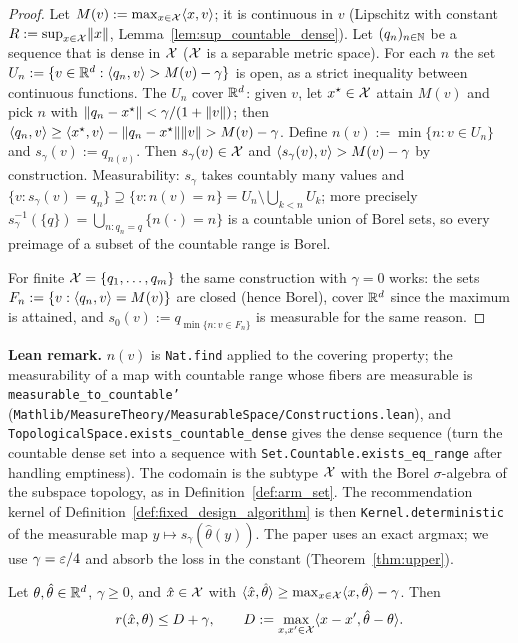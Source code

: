 \begin{proof}
\leanok
{}
Let $M(v) := \max_{x\in\mathcal{X}}\langle x, v \rangle$; it is continuous in $v$ (Lipschitz with constant
$R := \sup_{x\in\mathcal{X}}\lVert x \rVert$, Lemma~\ref{lem:sup_countable_dense}). Let $(q_n)_{n\in\mathbb{N}}$ be a
sequence that is dense in $\mathcal{X}$ ($\mathcal{X}$ is a separable metric space). For each $n$ the set
$U_n := \{v \in \mathbb{R}^d : \langle q_n, v \rangle > M(v) - \gamma\}$ is open, as a strict inequality between
continuous functions. The $U_n$ cover $\mathbb{R}^d$: given $v$, let $x^\star \in \mathcal{X}$ attain $M(v)$ and
pick $n$ with $\lVert q_n - x^\star \rVert < \gamma/(1 + \lVert v \rVert)$; then
$\langle q_n, v \rangle \ge \langle x^\star, v \rangle - \lVert q_n - x^\star \rVert\lVert v \rVert > M(v) - \gamma$. Define
$n(v) := \min\{n : v \in U_n\}$ and $s_\gamma(v) := q_{n(v)}$. Then $s_\gamma(v) \in \mathcal{X}$ and
$\langle s_\gamma(v), v \rangle > M(v) - \gamma$ by construction. Measurability: $s_\gamma$ takes countably
many values and $\{v : s_\gamma(v) = q_n\} \supseteq \{v : n(v) = n\} = U_n \setminus \bigcup_{k<n}U_k$;
more precisely $s_\gamma^{-1}(\{q\}) = \bigcup_{n : q_n = q}\{n(\cdot) = n\}$ is a countable union of
Borel sets, so every preimage of a subset of the countable range is Borel.

For finite $\mathcal{X} = \{q_1,\dots,q_m\}$ the same construction with $\gamma = 0$ works: the sets
$F_n := \{v : \langle q_n, v \rangle = M(v)\}$ are closed (hence Borel), cover $\mathbb{R}^d$ since the maximum is
attained, and $s_0(v) := q_{\min\{n : v \in F_n\}}$ is measurable for the same reason.
\end{proof}

\textbf{Lean remark.} $n(v)$ is \texttt{Nat.find} applied to the covering property; the
measurability of a map with countable range whose fibers are measurable is
\texttt{measurable\_to\_countable'} (\texttt{Mathlib/MeasureTheory/MeasurableSpace/Constructions.lean}),
and \texttt{TopologicalSpace.exists\_countable\_dense} gives the dense sequence (turn the
countable dense set into a sequence with \texttt{Set.Countable.exists\_eq\_range} after
handling emptiness). The codomain is the subtype $\mathcal{X}$ with the Borel $\sigma$-algebra of the
subspace topology, as in Definition~\ref{def:arm_set}. The recommendation kernel of
Definition~\ref{def:fixed_design_algorithm} is then \texttt{Kernel.deterministic} of the
measurable map $y \mapsto s_\gamma(\hat\theta(y))$. The paper uses an exact argmax; we use
$\gamma = \varepsilon/4$ and absorb the loss in the constant (Theorem~\ref{thm:upper}).

\begin{lemma}\label{lem:regret_le_difference_process}
\leanok
{}
Let $\theta, \hat\theta \in \mathbb{R}^d$, $\gamma \ge 0$, and $\hat{x} \in \mathcal{X}$ with
$\langle \hat{x}, \hat\theta \rangle \ge \max_{x\in\mathcal{X}}\langle x, \hat\theta \rangle - \gamma$. Then
\[
  r(\hat{x},\theta) \le D + \gamma,
  \qquad
  D := \max_{x,x'\in\mathcal{X}}\langle x - x', \hat\theta - \theta \rangle .
\]
\end{lemma}

